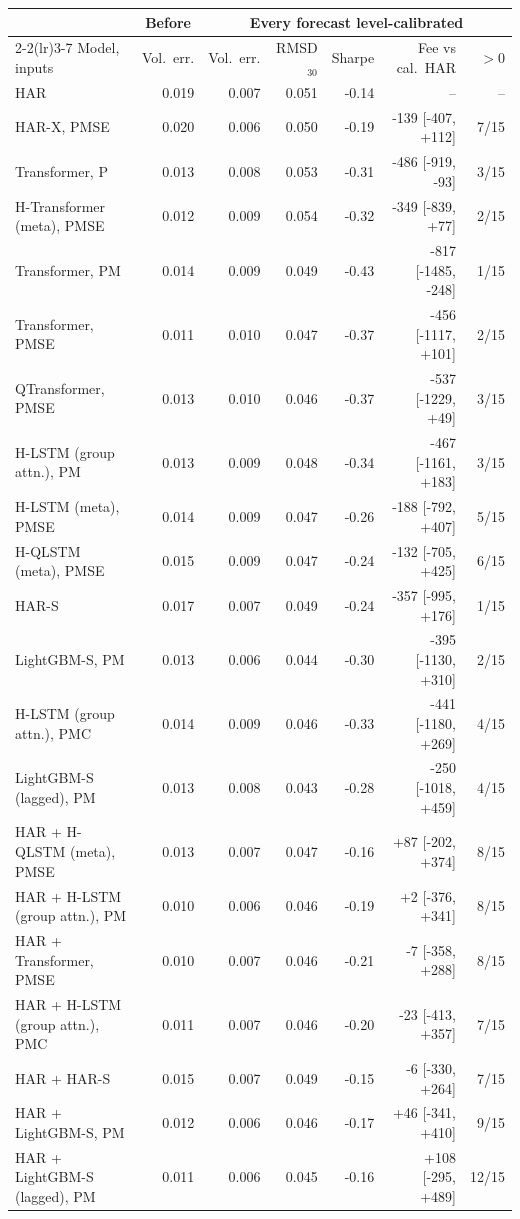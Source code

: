\begin{tabular}{lrrrrrr}
\toprule
 & \multicolumn{1}{c}{Before} & \multicolumn{5}{c}{Every forecast level-calibrated} \\
\cmidrule(lr){2-2}\cmidrule(lr){3-7}
Model, inputs & Vol.\ err. & Vol.\ err. & RMSD$_{30}$ & Sharpe & Fee vs cal.\ HAR & $>0$ \\
\midrule
HAR & 0.019 & 0.007 & 0.051 & -0.14 & -- & -- \\
HAR-X, PMSE & 0.020 & 0.006 & 0.050 & -0.19 & -139 [-407, +112] & 7/15 \\
Transformer, P & 0.013 & 0.008 & 0.053 & -0.31 & -486 [-919, -93] & 3/15 \\
H-Transformer (meta), PMSE & 0.012 & 0.009 & 0.054 & -0.32 & -349 [-839, +77] & 2/15 \\
Transformer, PM & 0.014 & 0.009 & 0.049 & -0.43 & -817 [-1485, -248] & 1/15 \\
Transformer, PMSE & 0.011 & 0.010 & 0.047 & -0.37 & -456 [-1117, +101] & 2/15 \\
QTransformer, PMSE & 0.013 & 0.010 & 0.046 & -0.37 & -537 [-1229, +49] & 3/15 \\
H-LSTM (group attn.), PM & 0.013 & 0.009 & 0.048 & -0.34 & -467 [-1161, +183] & 3/15 \\
H-LSTM (meta), PMSE & 0.014 & 0.009 & 0.047 & -0.26 & -188 [-792, +407] & 5/15 \\
H-QLSTM (meta), PMSE & 0.015 & 0.009 & 0.047 & -0.24 & -132 [-705, +425] & 6/15 \\
HAR-S & 0.017 & 0.007 & 0.049 & -0.24 & -357 [-995, +176] & 1/15 \\
LightGBM-S, PM & 0.013 & 0.006 & 0.044 & -0.30 & -395 [-1130, +310] & 2/15 \\
H-LSTM (group attn.), PMC & 0.014 & 0.009 & 0.046 & -0.33 & -441 [-1180, +269] & 4/15 \\
LightGBM-S (lagged), PM & 0.013 & 0.008 & 0.043 & -0.28 & -250 [-1018, +459] & 4/15 \\
\midrule
HAR + H-QLSTM (meta), PMSE & 0.013 & 0.007 & 0.047 & -0.16 & +87 [-202, +374] & 8/15 \\
HAR + H-LSTM (group attn.), PM & 0.010 & 0.006 & 0.046 & -0.19 & +2 [-376, +341] & 8/15 \\
HAR + Transformer, PMSE & 0.010 & 0.007 & 0.046 & -0.21 & -7 [-358, +288] & 8/15 \\
HAR + H-LSTM (group attn.), PMC & 0.011 & 0.007 & 0.046 & -0.20 & -23 [-413, +357] & 7/15 \\
HAR + HAR-S & 0.015 & 0.007 & 0.049 & -0.15 & -6 [-330, +264] & 7/15 \\
HAR + LightGBM-S, PM & 0.012 & 0.006 & 0.046 & -0.17 & +46 [-341, +410] & 9/15 \\
HAR + LightGBM-S (lagged), PM & 0.011 & 0.006 & 0.045 & -0.16 & +108 [-295, +489] & 12/15 \\
\bottomrule
\end{tabular}
